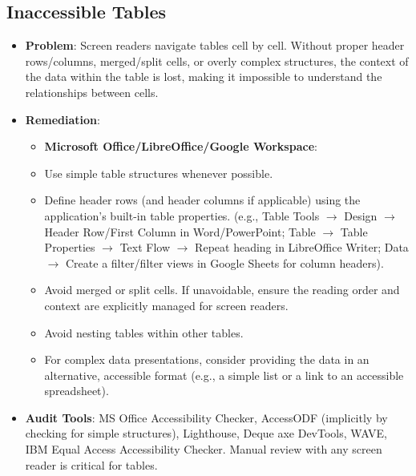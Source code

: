 \subsection{Inaccessible Tables}
\begin{itemize}
    \item \textbf{Problem}: Screen readers navigate tables cell by cell. Without proper header rows/columns, merged/split cells, or overly complex structures, the context of the data within the table is lost, making it impossible to understand the relationships between cells.
    \item \textbf{Remediation}:
        \begin{itemize}
            \item \textbf{Microsoft Office/LibreOffice/Google Workspace}:
            \item Use simple table structures whenever possible.
            \item Define header rows (and header columns if applicable) using the application's built-in table properties. (e.g., Table Tools $\rightarrow$ Design $\rightarrow$ Header Row/First Column in Word/PowerPoint; Table $\rightarrow$ Table Properties $\rightarrow$ Text Flow $\rightarrow$ Repeat heading in LibreOffice Writer; Data $\rightarrow$ Create a filter/filter views in Google Sheets for column headers).
            \item Avoid merged or split cells. If unavoidable, ensure the reading order and context are explicitly managed for screen readers.
            \item Avoid nesting tables within other tables.
            \item For complex data presentations, consider providing the data in an alternative, accessible format (e.g., a simple list or a link to an accessible spreadsheet).
        \end{itemize}
    \item \textbf{Audit Tools}: MS Office Accessibility Checker, AccessODF (implicitly by checking for simple structures), Lighthouse, Deque axe DevTools, WAVE, IBM Equal Access Accessibility Checker. Manual review with any screen reader is critical for tables.
\end{itemize}

